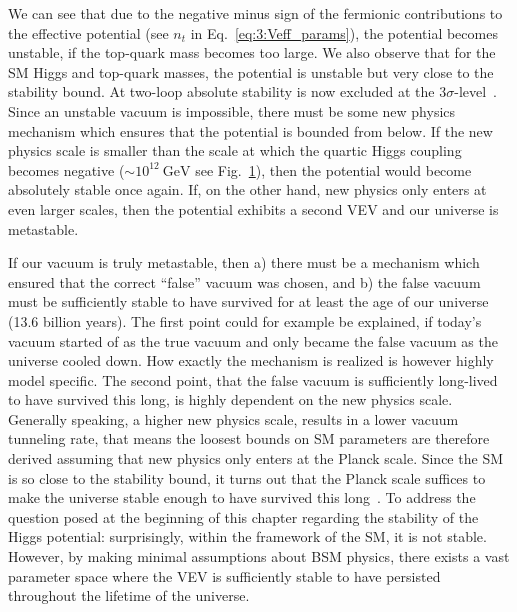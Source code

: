 \begin{figure}[h]
\begin{minipage}[t]{0.48\textwidth}
  \label{fig:3:running_couplings}
  \end{minipage}
\end{figure}
We can see that due to the negative minus sign of the fermionic contributions to the effective potential (see $n_t$ in Eq.~\eqref{eq:3:Veff_params}), the potential becomes unstable, if the top-quark mass becomes too large. We also observe that for the \acs{SM} Higgs and top-quark masses, the potential is unstable but very close to the stability bound. At two-loop absolute stability is now excluded at the $3\sigma$-level~\cite{Degrassi:2012ry}. Since an unstable vacuum is impossible, there must be some new physics mechanism which ensures that the potential is bounded from below. If the new physics scale is smaller than the scale at which the quartic Higgs coupling becomes negative ($\sim 10^{12}\ \mathrm{GeV}$ see Fig.~\ref{fig:3:running_couplings}), then the potential would become absolutely stable once again. If, on the other hand, new physics only enters at even larger scales, then the potential exhibits a second \acs{VEV} and our universe is metastable.

If our vacuum is truly metastable, then a) there must be a mechanism which ensured that the correct ``false'' vacuum was chosen, and b) the false vacuum must be sufficiently stable to have survived for at least the age of our universe (13.6 billion years). The first point could for example be explained, if today's vacuum started of as the true vacuum and only became the false vacuum as the universe cooled down. How exactly the mechanism is realized is however highly model specific. The second point, that the false vacuum is sufficiently long-lived to have survived this long, is highly dependent on the new physics scale. Generally speaking, a higher new physics scale, results in a lower vacuum tunneling rate, that means the loosest bounds on \acs{SM} parameters are therefore derived assuming that new physics only enters at the Planck scale. Since the \acs{SM} is so close to the stability bound, it turns out that the Planck scale suffices to make the universe stable enough to have survived this long~\cite{Degrassi:2012ry}. To address the question posed at the beginning of this chapter regarding the stability of the Higgs potential: surprisingly, within the framework of the \acs{SM}, it is not stable. However, by making minimal assumptions about \acs{BSM} physics, there exists a vast parameter space where the \acs{VEV} is sufficiently stable to have persisted throughout the lifetime of the universe.

